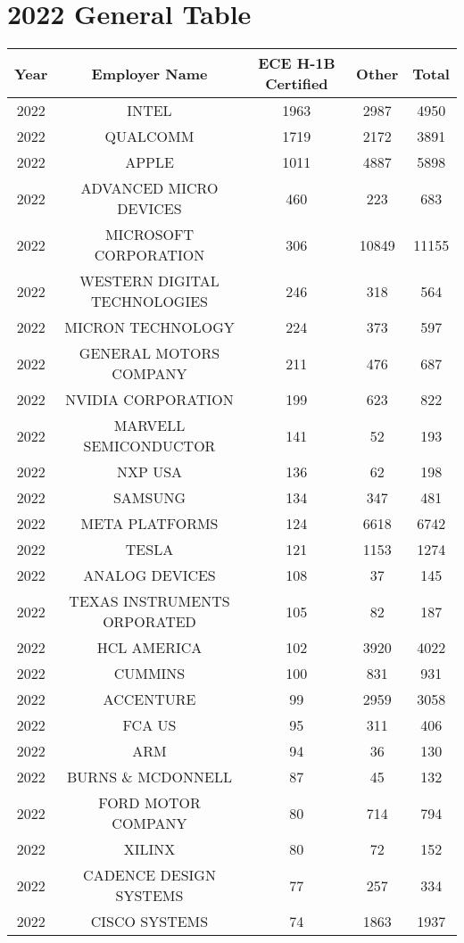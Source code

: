 \documentclass{article}%
\begin{document}
\section{2022 General Table}%
\label{sec:2022GeneralTable}%
\begin{longtable}{c|c|c|c|c}%
\hline%
Year&Employer Name&ECE \newline%
 H{-}1B \newline%
 Certified&Other&Total\\%
\hline%
2022&INTEL&1963&2987&4950\\%
\hline%
2022&QUALCOMM&1719&2172&3891\\%
\hline%
2022&APPLE&1011&4887&5898\\%
\hline%
2022&ADVANCED MICRO DEVICES&460&223&683\\%
\hline%
2022&MICROSOFT CORPORATION&306&10849&11155\\%
\hline%
2022&WESTERN DIGITAL TECHNOLOGIES&246&318&564\\%
\hline%
2022&MICRON TECHNOLOGY&224&373&597\\%
\hline%
2022&GENERAL MOTORS COMPANY&211&476&687\\%
\hline%
2022&NVIDIA CORPORATION&199&623&822\\%
\hline%
2022&MARVELL SEMICONDUCTOR&141&52&193\\%
\hline%
2022&NXP USA&136&62&198\\%
\hline%
2022&SAMSUNG&134&347&481\\%
\hline%
2022&META PLATFORMS&124&6618&6742\\%
\hline%
2022&TESLA&121&1153&1274\\%
\hline%
2022&ANALOG DEVICES&108&37&145\\%
\hline%
2022&TEXAS INSTRUMENTS ORPORATED&105&82&187\\%
\hline%
2022&HCL AMERICA&102&3920&4022\\%
\hline%
2022&CUMMINS&100&831&931\\%
\hline%
2022&ACCENTURE&99&2959&3058\\%
\hline%
2022&FCA US&95&311&406\\%
\hline%
2022&ARM&94&36&130\\%
\hline%
2022&BURNS \& MCDONNELL&87&45&132\\%
\hline%
2022&FORD MOTOR COMPANY&80&714&794\\%
\hline%
2022&XILINX&80&72&152\\%
\hline%
2022&CADENCE DESIGN SYSTEMS&77&257&334\\%
\hline%
2022&CISCO SYSTEMS&74&1863&1937\\%

\end{longtable}
\end{document}
